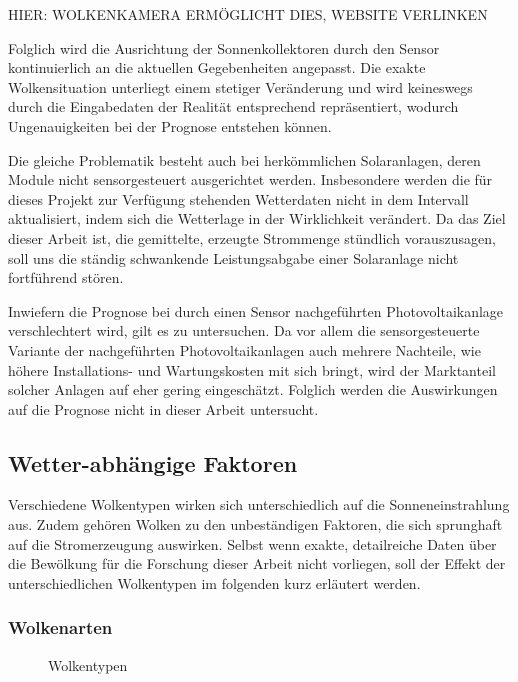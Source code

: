 \documentclass[12pt, a4paper]{article}
\begin{document}
HIER: WOLKENKAMERA ERMÖGLICHT DIES, WEBSITE VERLINKEN

Folglich wird die Ausrichtung der Sonnenkollektoren durch den Sensor kontinuierlich an die aktuellen Gegebenheiten angepasst. Die exakte Wolkensituation unterliegt einem stetiger Veränderung und wird keineswegs durch die Eingabedaten der Realität entsprechend repräsentiert, wodurch Ungenauigkeiten bei der Prognose entstehen können.

Die gleiche Problematik besteht auch bei herkömmlichen Solaranlagen, deren Module nicht sensorgesteuert ausgerichtet werden. Insbesondere werden die für dieses Projekt zur Verfügung stehenden Wetterdaten  nicht in dem Intervall aktualisiert, indem sich die Wetterlage in der Wirklichkeit verändert. Da das Ziel dieser Arbeit ist, die gemittelte, erzeugte Strommenge stündlich vorauszusagen, soll uns die ständig schwankende Leistungsabgabe einer Solaranlage nicht fortführend stören. 

Inwiefern die Prognose bei durch einen Sensor nachgeführten Photovoltaikanlage verschlechtert wird, gilt es zu untersuchen. Da vor allem die sensorgesteuerte Variante der nachgeführten Photovoltaikanlagen auch mehrere Nachteile, wie höhere Installations- und Wartungskosten mit sich bringt, wird der Marktanteil solcher Anlagen auf eher gering eingeschätzt. Folglich werden die Auswirkungen auf die Prognose nicht in dieser Arbeit untersucht.

\subsection{Wetter-abhängige Faktoren}

Verschiedene Wolkentypen wirken sich unterschiedlich auf die Sonneneinstrahlung aus. Zudem gehören Wolken zu den unbeständigen Faktoren, die sich sprunghaft auf die Stromerzeugung auswirken. Selbst wenn exakte, detailreiche Daten über die Bewölkung für die Forschung dieser Arbeit nicht vorliegen, soll der Effekt der unterschiedlichen Wolkentypen im folgenden kurz erläutert werden.

\subsubsection{Wolkenarten}

\begin{figure}
\centering
\def\svgwidth{400pt}

\caption{Wolkentypen}
\label{wolkentypen}
\end{figure}
\end{document}
